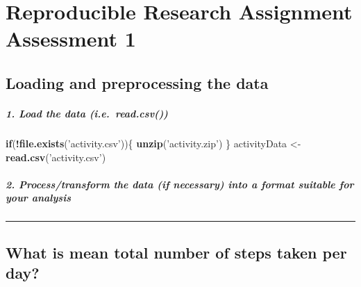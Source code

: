 \documentclass[]{article}
\title{}
\author{}
\date{}
\newenvironment{Shaded}{\begin{snugshade}}{\end{snugshade}}
\newcommand{\CommentTok}[1]{\textcolor[rgb]{0.56,0.35,0.01}{\textit{#1}}}
\newcommand{\ControlFlowTok}[1]{\textcolor[rgb]{0.13,0.29,0.53}{\textbf{#1}}}
\newcommand{\KeywordTok}[1]{\textcolor[rgb]{0.13,0.29,0.53}{\textbf{#1}}}
\newcommand{\NormalTok}[1]{#1}
\newcommand{\OperatorTok}[1]{\textcolor[rgb]{0.81,0.36,0.00}{\textbf{#1}}}
\newcommand{\StringTok}[1]{\textcolor[rgb]{0.31,0.60,0.02}{#1}}
\let\oldsubparagraph\subparagraph
\renewcommand{\subparagraph}[1]{\oldsubparagraph{#1}\mbox{}}
\begin{document}
\hypertarget{reproducible-research-assignment-assessment-1}{%
\section{Reproducible Research Assignment Assessment
1}\label{reproducible-research-assignment-assessment-1}}

\hypertarget{loading-and-preprocessing-the-data}{%
\subsection{Loading and preprocessing the
data}\label{loading-and-preprocessing-the-data}}

\hypertarget{load-the-data-i.e.-read.csv}{%
\subparagraph{1. Load the data
(i.e.~read.csv())}\label{load-the-data-i.e.-read.csv}}

\begin{Shaded}
\begin{Highlighting}[]
\ControlFlowTok{if}\NormalTok{(}\OperatorTok{!}\KeywordTok{file.exists}\NormalTok{(}\StringTok{'activity.csv'}\NormalTok{))\{}
    \KeywordTok{unzip}\NormalTok{(}\StringTok{'activity.zip'}\NormalTok{)}
\NormalTok{\}}
\NormalTok{activityData <-}\StringTok{ }\KeywordTok{read.csv}\NormalTok{(}\StringTok{'activity.csv'}\NormalTok{)}
\end{Highlighting}
\end{Shaded}

\hypertarget{processtransform-the-data-if-necessary-into-a-format-suitable-for-your-analysis}{%
\subparagraph{2. Process/transform the data (if necessary) into a format
suitable for your
analysis}\label{processtransform-the-data-if-necessary-into-a-format-suitable-for-your-analysis}}

\begin{Shaded}
\end{Shaded}

\begin{center}\rule{0.5\linewidth}{\linethickness}\end{center}

\hypertarget{what-is-mean-total-number-of-steps-taken-per-day}{%
\subsection{What is mean total number of steps taken per
day?}\label{what-is-mean-total-number-of-steps-taken-per-day}}
\end{document}
